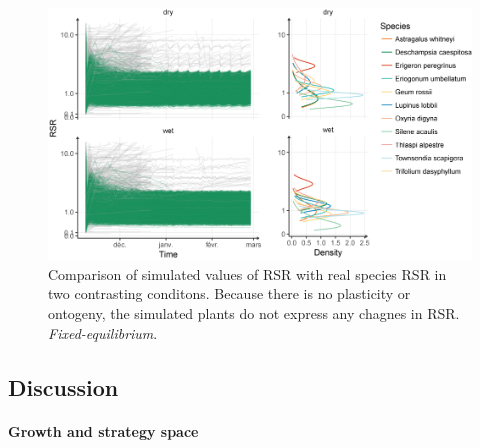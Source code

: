 \begin{figure}\label{fig:comparison_RSR}
\includegraphics[width = \textwidth]{./2_PP/Figures/Calibration/RSR_full_sim_f-e.png}
\caption{Comparison of simulated values of RSR with real species RSR in two contrasting conditons. Because there is no plasticity or ontogeny, the simulated plants do not express any chagnes in RSR. \textit{Fixed-equilibrium}.}
\end{figure}


\vspace{2cm}

\subsection{Discussion}

\paragraph{Growth and strategy space}

